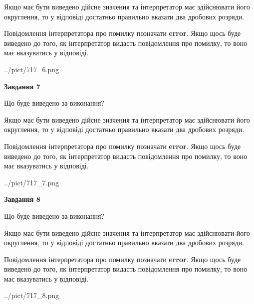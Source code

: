 \documentclass[12pt, ukrainian]{article}
\begin{document}
{\begin {Large}
Якщо має бути виведено дійсне значення та інтерпретатор має здійснювати його округлення, 
то у відповіді достатньо правильно вказати два дробових розряди.

Повідомлення інтерпретатора про помилку позначати \textbf{error}.
Якщо щось буде виведено до того, як інтерпретатор видасть повідомлення про помилку, 
то воно має вказуватись у відповіді. \par

\begin{center}
	{../pict/717_6.png}
\end{center}
\newpage

{\begin {center}\textbf{Завдання 7}\end {center}}\par
Що буде виведено за виконання? \par

Якщо має бути виведено дійсне значення та інтерпретатор має здійснювати його округлення, 
то у відповіді достатньо правильно вказати два дробових розряди.

Повідомлення інтерпретатора про помилку позначати \textbf{error}.
Якщо щось буде виведено до того, як інтерпретатор видасть повідомлення про помилку, 
то воно має вказуватись у відповіді. \par

\begin{center}
	{../pict/717_7.png}
\end{center}
\newpage

{\begin {center}\textbf{Завдання 8}\end {center}}\par
Що буде виведено за виконання? \par

Якщо має бути виведено дійсне значення та інтерпретатор має здійснювати його округлення, 
то у відповіді достатньо правильно вказати два дробових розряди.

Повідомлення інтерпретатора про помилку позначати \textbf{error}.
Якщо щось буде виведено до того, як інтерпретатор видасть повідомлення про помилку, 
то воно має вказуватись у відповіді. \par

\begin{center}
	{../pict/717_8.png}
\end{center}
\newpage


\end{Large}}
\end{document}

